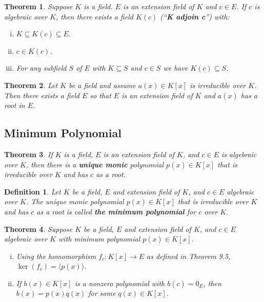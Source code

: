 \documentclass[letterpaper, 12pt]{article}
\newcommand{\pid}[1]{\langle #1 \rangle}
\newtheorem{defn}{Definition}
\newtheorem{thm}{Theorem}
\begin{document}
			\begin{thm}
			Suppose $K$ is a field.
			$E$ is an extension field of $K$ and $c \in E$.
			If $c$ is algebraic over $K$, then there exists a field $K(c)$ (``\textbf{K adjoin c}'') with:
				\begin{enumerate}[(i)]
				\item $K \subseteq K(c) \subseteq E$.
				\item $c \in K(c)$.
				\item For any subfield $S$ of $E$ with $K \subseteq S$ and $c \in S$ we have $K(c) \subseteq S$.
				\end{enumerate}
			\end{thm}

			\setcounter{thm}{6}
			\begin{thm}
			Let $K$ be a field and assume $a(x) \in K[x]$ is irreducible over $K$.
			Then there exists a field $E$ so that $E$ is an extension field of $K$ and $a(x)$ has a root in $E$.
			\end{thm}

		\subsection{Minimum Polynomial}
		\label{sec:minimum_polynomial}
			\setcounter{thm}{8}
			\begin{thm}
			If $K$ is a field, $E$ is an extension field of $K$, and $c \in E$ is algebraic over $K$, then there is a \textbf{\textit{unique monic}} polynomial $p(x) \in K[x]$ that is irreducible over $K$ and has $c$ as a root.
			\end{thm}

			\setcounter{defn}{9}
			\begin{defn}
			Let $K$ be a field, $E$ and extension field of $K$, and $c \in E$ algebraic over $K$.
			The unique monic polynomial $p(x) \in K[x]$ that is irreducible over $K$ and has $c$ as a root is called \textbf{\textit{the minimum polynomial}} for $c$ over $K$.
			\end{defn}

			\setcounter{thm}{11}
			\begin{thm}
			Suppose $K$ be a field, $E$ and extension field of $K$, and $c \in E$ algebraic over $K$ with minimum polynomial $p(x) \in K[x]$.
				\begin{enumerate}[(i)]
				\item Using the homomorphism $f_{c} : K[x] \to E$ as defined in Theorem 9.5, $\ker{(f_{c})} = \pid{p(x)}$.
				\item If $b(x) \in K[x]$ is a nonzero polynomial with $b(c) = 0_{E}$, then $b(x) = p(x)q(x)$ for some $q(x) \in K[x]$.
				\end{enumerate}
			\end{thm}
\end{document}
